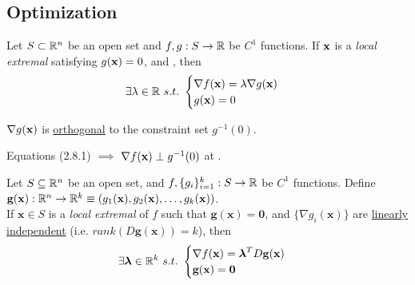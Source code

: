 \documentclass[11pt]{article}
\begin{document}
		\subsection{}
		\subsection{Optimization}
			\begin{theorem}
				Let $S \subset \mathbb{R}^n$ be an open set and $f, g: S \to \mathbb{R}$ be $C^1$ functions. If $\textbf{x}$ is a \emph{local extremal} satisfying $g(\textbf{x}) = 0$, and , then
				\begin{equation}
					\exists \lambda \in \mathbb{R}\ s.t.\ \begin{cases}
						\nabla f(\textbf{x}) = \lambda \nabla g(\textbf{x}) \\
						g(\textbf{x}) = 0
					\end{cases}
				\end{equation}
			\end{theorem}
			
			\begin{lemma}
				$\nabla g(\textbf{x})$ is \ul{orthogonal} to the constraint set $g^{-1}(0)$.
			\end{lemma}
			
			\begin{proposition}
				Equations (2.8.1) $\implies$ $\nabla f(\textbf{x}) \perp g^{-1}(0)$ at \tbf{x}.
			\end{proposition}
			
			\begin{theorem}
				Let $S \subseteq \mathbb{R}^n$ be an open set, and $f, \{g_i\}_{i=1}^k : S \to \mathbb{R}$ be $C^1$ functions. Define $\textbf{g}(\textbf{x}): \mathbb{R}^n \to \mathbb{R}^k \equiv (g_1(\textbf{x}), g_2(\textbf{x}), \dots, g_k(\textbf{x}))$. \\
				If $\textbf{x} \in S$ is a \emph{local extremal} of $f$ such that $\textbf{g}(\textbf{x}) = \textbf{0}$, and $\{\nabla g_i(\textbf{x})\}$ are \ul{linearly independent} (i.e. $rank(D\textbf{g}(\textbf{x})) = k$), then
				\begin{equation}
					\exists \boldsymbol{\lambda} \in \R^k\ s.t.\ \begin{cases}
						\nabla f(\textbf{x}) = \boldsymbol{\lambda}^T D\textbf{g}(\textbf{x}) \\
						\textbf{g}(\textbf{x}) =\textbf{0}
					\end{cases}
				\end{equation}
			\end{theorem}
			
\end{document}
